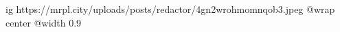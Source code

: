  
 
 
 
 

\ifcmt
  ig https://mrpl.city/uploads/posts/redactor/4gn2wrohmomnqob3.jpeg
  @wrap center
  @width 0.9
\fi
